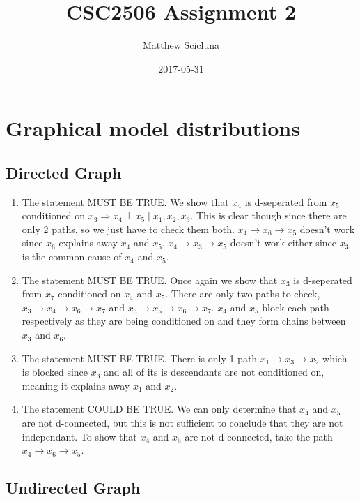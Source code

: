 \documentclass[]{article}
\title{CSC2506 Assignment 2}
\author{Matthew Scicluna}
\date{2017-05-31}
\begin{document}
\maketitle

\section{Graphical model
distributions}\label{graphical-model-distributions}

\subsection{Directed Graph}\label{directed-graph}

\begin{enumerate}
\def\labelenumi{\arabic{enumi}.}
\item
  The statement MUST BE TRUE. We show that \(x_4\) is d-seperated from
  \(x_5\) conditioned on
  \(x_3 \Rightarrow x_4 \perp x_5 \mid x_1, x_2, x_3\). This is clear
  though since there are only 2 paths, so we just have to check them
  both. \(x_4 \rightarrow x_6 \rightarrow x_5\) doesn't work since
  \(x_6\) explains away \(x_4\) and \(x_5\).
  \(x_4 \rightarrow x_3 \rightarrow x_5\) doesn't work either since
  \(x_3\) is the common cause of \(x_4\) and \(x_5\).
\item
  The statement MUST BE TRUE. Once again we show that \(x_3\) is
  d-seperated from \(x_7\) conditioned on \(x_4\) and \(x_5\). There are
  only two paths to check,
  \(x_3 \rightarrow x_4 \rightarrow x_6 \rightarrow x_7\) and
  \(x_3 \rightarrow x_5 \rightarrow x_6 \rightarrow x_7\). \(x_4\) and
  \(x_5\) block each path respectively as they are being conditioned on
  and they form chains between \(x_3\) and \(x_6\).
\item
  The statement MUST BE TRUE. There is only 1 path
  \(x_1 \rightarrow x_3 \rightarrow x_2\) which is blocked since \(x_3\)
  and all of its is descendants are not conditioned on, meaning it
  explains away \(x_1\) and \(x_2\).
\item
  The statement COULD BE TRUE. We can only determine that \(x_4\) and
  \(x_5\) are not d-connected, but this is not sufficient to conclude
  that they are not independant. To show that \(x_4\) and \(x_5\) are
  not d-connected, take the path
  \(x_4 \rightarrow x_6 \rightarrow x_5\).
\end{enumerate}

\subsection{Undirected Graph}\label{undirected-graph}
\end{document}
